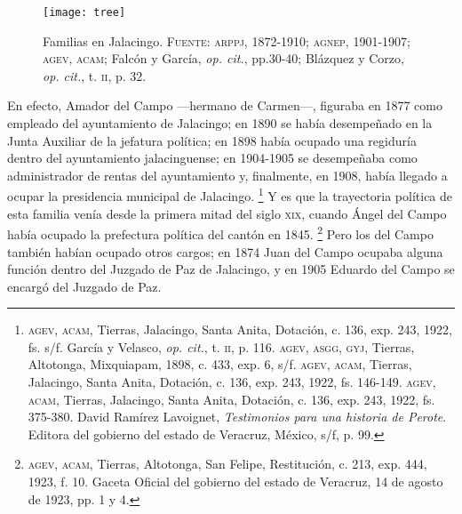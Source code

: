 \documentclass[14pt,twoside,final]{extbook} %
\let\oldfootnote\footnote
\renewcommand\footnote[1]{%
\oldfootnote{\hspace{1mm}#1}}
\begin{document}
\begin{figure}
\centering
\texttt{[image: tree]}
\caption[Familias en Jalacingo]{Familias en Jalacingo. \textsc{Fuente:} \textsc{arppj, 1872-1910}; \textsc{agnep}, 1901-1907; \textsc{agev, acam}; Falcón y García, \emph{op. cit.}, pp.30-40; Blázquez y Corzo, \emph{op. cit.}, t. \textsc{ii}, p. 32.}
\label{fig:arbol-genealogico}
\end{figure}
En efecto, Amador del Campo ---hermano de Carmen---, figuraba en 1877 como empleado del ayuntamiento de Jalacingo; en 1890 se había desempeñado en la Junta Auxiliar de la jefatura política; en 1898 había ocupado una regiduría dentro del ayuntamiento jalacinguense; en 1904-1905 se desempeñaba como administrador de rentas del ayuntamiento y, finalmente, en 1908, había llegado a ocupar la presidencia municipal de Jalacingo.\footnote{\textsc{agev, acam}, Tierras, Jalacingo, Santa Anita, Dotación, c. 136, exp. 243, 1922, fs. s/f. García y Velasco, \emph{op. cit.}, t. \textsc{ii}, p. 116. \textsc{agev, asgg, gyj}, Tierras, Altotonga, Mixquiapam, 1898, c. 433, exp. 6, s/f. \textsc{agev, acam}, Tierras, Jalacingo, Santa Anita, Dotación, c. 136, exp. 243, 1922, fs. 146-149. \textsc{agev, acam}, Tierras, Jalacingo, Santa Anita, Dotación, c. 136, exp. 243, 1922, fs. 375-380. David Ramírez Lavoignet, \emph{Testimonios para una historia de Perote}. Editora del gobierno del estado de Veracruz, México, s/f, p. 99.} Y es que la trayectoria política de esta familia venía desde la primera mitad del siglo \textsc{xix}, cuando Ángel del Campo había ocupado la prefectura política del cantón en 1845.\footnote{\textsc{agev, acam}, Tierras, Altotonga, San Felipe, Restitución, c. 213, exp. 444, 1923, f. 10. Gaceta Oficial del gobierno del estado de Veracruz, 14 de agosto de 1923, pp. 1 y 4.} Pero los del Campo también habían ocupado otros cargos; en 1874 Juan del Campo ocupaba alguna función dentro del Juzgado de Paz de Jalacingo, y en 1905 Eduardo del Campo se encargó del Juzgado de Paz.
\end{document}
